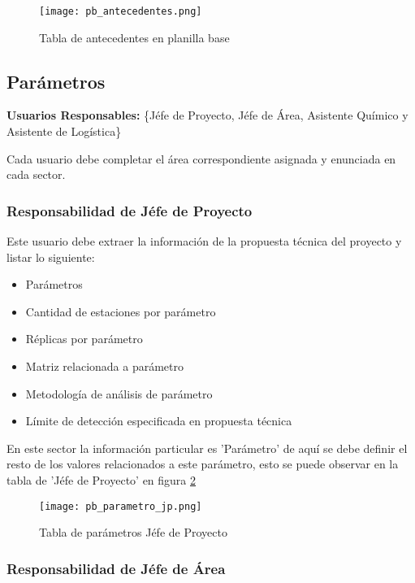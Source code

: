 \begin{figure}
	\centering
	\texttt{[image: pb\_antecedentes.png]}
	\caption{Tabla de antecedentes en planilla base}
	\label{pb_antecedentes}
\end{figure}
 
\subsection{Parámetros} 

\textbf{Usuarios Responsables:} \{Jéfe de Proyecto, Jéfe de Área, Asistente Químico y Asistente de Logística\}

Cada usuario debe completar el área correspondiente asignada y enunciada en cada sector.

\subsubsection{Responsabilidad de Jéfe de Proyecto}

Este usuario debe extraer la información de la propuesta técnica del proyecto y listar lo
siguiente:

\begin{itemize}
 \item Parámetros
 \item Cantidad de estaciones por parámetro
 \item Réplicas por parámetro
 \item Matriz relacionada a parámetro
 \item Metodología de análisis de parámetro 
 \item Límite de detección especificada en propuesta técnica
\end{itemize}

En este sector la información particular es 'Parámetro' de aquí se debe definir el resto de los valores relacionados a este parámetro, esto se puede observar en la tabla de 'Jéfe de Proyecto' en figura \ref{pb_parametro_jp}

\begin{figure}
	\centering
	\texttt{[image: pb\_parametro\_jp.png]}
	\caption{Tabla de parámetros Jéfe de Proyecto}
	\label{pb_parametro_jp}
\end{figure}

\subsubsection{Responsabilidad de Jéfe de Área}

